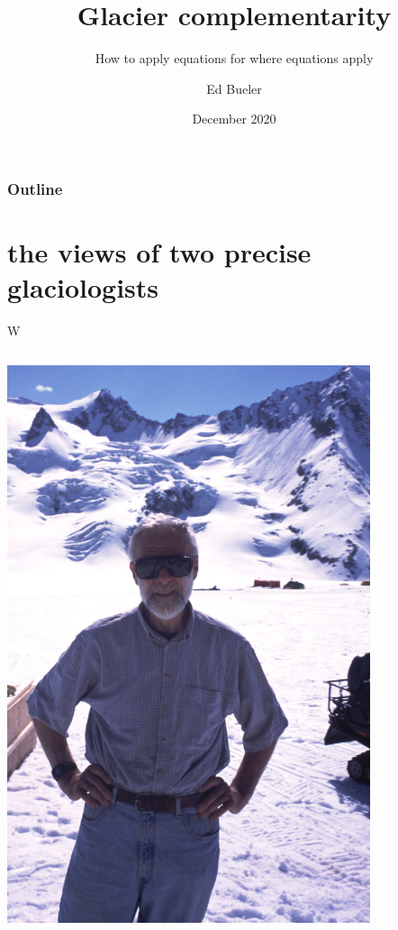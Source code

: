 \documentclass[10pt,hyperref,dvipsnames]{beamer}
\title{Glacier complementarity}
\subtitle{How to apply equations for where equations apply}
\author{Ed Bueler}
\institute[UAF]{University of Alaska Fairbanks}
\date{December 2020}
\begin{document}
\beamertemplatenavigationsymbolsempty

\begin{frame}
  \maketitle
\end{frame}

\begin{frame}
  \frametitle{Outline}
  \tableofcontents[hideallsubsections]
\end{frame}


\section{the views of two precise glaciologists}

\begin{frame}{W}

\begin{columns}
\begin{column}{0.5\textwidth}
\includegraphics[width=0.8\textwidth]{figs/Will-by-Truffer.jpg}


\end{column}
\end{columns}
\end{frame}
\end{document}
